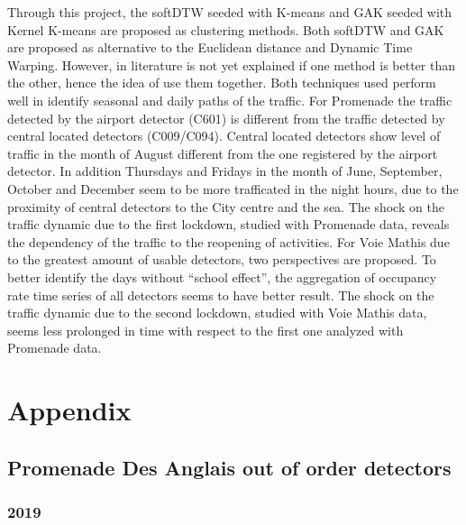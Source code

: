 \documentclass[11pt]{article}
\begin{document}
    Through this project, the softDTW seeded with K-means and GAK seeded
with Kernel K-means are proposed as clustering methods. Both softDTW and
GAK are proposed as alternative to the Euclidean distance and Dynamic
Time Warping. However, in literature is not yet explained if one method
is better than the other, hence the idea of use them together. Both
techniques used perform well in identify seasonal and daily paths of the
traffic. For Promenade the traffic detected by the airport detector
(C601) is different from the traffic detected by central located
detectors (C009/C094). Central located detectors show level of traffic
in the month of August different from the one registered by the airport
detector. In addition Thursdays and Fridays in the month of June,
September, October and December seem to be more trafficated in the night
hours, due to the proximity of central detectors to the City centre and
the sea. The shock on the traffic dynamic due to the first lockdown,
studied with Promenade data, reveals the dependency of the traffic to
the reopening of activities. For Voie Mathis due to the greatest amount
of usable detectors, two perspectives are proposed. To better identify
the days without ``school effect'', the aggregation of occupancy rate
time series of all detectors seems to have better result. The shock on
the traffic dynamic due to the second lockdown, studied with Voie Mathis
data, seems less prolonged in time with respect to the first one
analyzed with Promenade data.

    \section{Appendix} \label{Appendix}

    \subsection{ Promenade Des Anglais out of order detectors}

    \hypertarget{section}{%
\subsubsection{2019}\label{section}}
\end{document}
